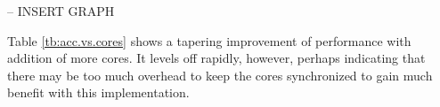 -- INSERT GRAPH

Table \ref{tb:acc.vs.cores} shows a tapering improvement of performance with addition of more cores. It levels off rapidly, however, perhaps indicating that there may be too much overhead to keep the cores synchronized to gain much benefit with this implementation.

\begin{table}
\centering
{}
	\caption{Benchmarking under different number of cores.}
	\label{tb:acc.vs.cores}
\end{table}


